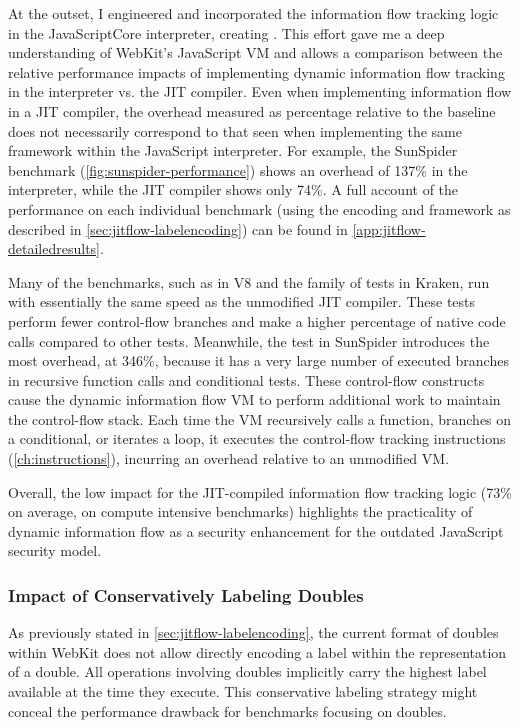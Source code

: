 At the outset, I engineered and incorporated the information flow tracking logic in the JavaScriptCore interpreter, creating \FlowCore.
This effort gave me a deep understanding of WebKit's JavaScript VM and allows a comparison between the relative performance impacts of implementing dynamic information flow tracking in the interpreter vs. the JIT compiler.
Even when implementing information flow in a JIT compiler, the overhead measured as percentage relative to the baseline does not necessarily correspond to that seen when implementing the same framework within the JavaScript interpreter.
For example, the SunSpider benchmark (\autoref{fig:sunspider-performance}) shows an overhead of 137\% in the interpreter, while the JIT compiler shows only 74\%.
A full account of the performance on each individual benchmark (using the encoding and framework as described in \autoref{sec:jitflow-labelencoding}) can be found in \autoref{app:jitflow-detailedresults}.

Many of the benchmarks, such as  in V8 and the  family of tests in Kraken, run with essentially the same speed as the unmodified JIT compiler.
These tests perform fewer control-flow branches and make a higher percentage of native code calls compared to other tests.
Meanwhile, the  test in SunSpider introduces the most overhead, at 346\%, because it has a very large number of executed branches in recursive function calls and conditional tests.
These control-flow constructs cause the dynamic information flow VM to perform additional work to maintain the control-flow stack.
Each time the VM recursively calls a function, branches on a conditional, or iterates a loop, it executes the control-flow tracking instructions (\autoref{ch:instructions}), incurring an overhead relative to an unmodified VM.

Overall, the low impact for the JIT-compiled information flow tracking logic (73\% on average, on compute intensive benchmarks) highlights the practicality of dynamic information flow as a security enhancement for the outdated JavaScript security model.

\subsubsection{Impact of Conservatively Labeling Doubles}
\label{sec:jitflow-impact-doubles}

As previously stated in \autoref{sec:jitflow-labelencoding}, the current format of doubles within WebKit does not allow directly encoding a label within the representation of a double.
All operations involving doubles implicitly carry the highest label available at the time they execute.
This conservative labeling strategy might conceal the performance drawback for benchmarks focusing on doubles.

